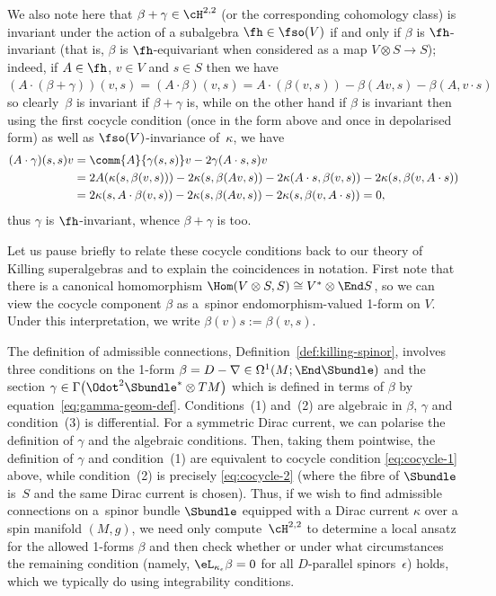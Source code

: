 We also note here that $\beta+\gamma\in\cH^{2,2}$ (or the corresponding cohomology class) is invariant under the action of a subalgebra $\fh\in\fso(V)$ if and only if $\beta$ is $\fh$-invariant (that is, $\beta$ is $\fh$-equivariant when considered as a map $V\otimes S\to S$); indeed, if $A\in\fh$, $v\in V$ and $s\in S$ then we have~${(A\cdot(\beta+\gamma))(v,s) = (A\cdot\beta)(v,s) = A\cdot (\beta(v,s)) - \beta(Av,s) - \beta(A,v\cdot s)}
$
so clearly~$\beta$ is invariant if $\beta+\gamma$ is, while on the other hand if $\beta$ is invariant then using the first cocycle condition (once in the form above and once in depolarised form) as well as $\fso(V)$-invariance of~$\kappa$, we have
\begin{align*}
(A\cdot\gamma)(s,s)v &= \comm{A}{\gamma(s,s)}v - 2\gamma(A\cdot s,s)v \\
	&= 2A(\kappa(s,\beta(v,s))) - 2\kappa(s,\beta(Av,s)) - 2\kappa(A\cdot s,\beta(v,s)) - 2\kappa(s,\beta(v,A\cdot s)) \\
	&= 2\kappa(s,A\cdot\beta(v,s)) - 2\kappa(s,\beta(Av,s)) - 2\kappa(s,\beta(v,A\cdot s))= 0,
\end{align*}
thus $\gamma$ is $\fh$-invariant, whence $\beta+\gamma$ is too.

\begin{Remark}
	Let us pause briefly to relate these cocycle conditions back to our theory of Killing superalgebras and to explain the coincidences in notation. First note that there is a canonical homomorphism $\Hom(V\otimes S,S)\cong V^*\otimes\End S$, so we can view the cocycle component $\beta$ as a~spinor endomorphism-valued 1-form on $V$. Under this interpretation, we write $\beta(v)s:=\beta(v,s)$.
	
	The definition of admissible connections, Definition~\ref{def:killing-spinor}, involves three conditions on the 1-form $\beta=D-\nabla\in\Omega^1(M;\End\Sbundle)$ and the section $\gamma\in\Gamma\bigl(\Odot^2\Sbundle^*\otimes TM\bigr)$ which is defined in terms of $\beta$ by equation~\eqref{eq:gamma-geom-def}. Conditions~(1) and~(2) are algebraic in $\beta$, $\gamma$ and condition~(3) is differential. For a symmetric Dirac current, we can polarise the definition of $\gamma$ and the algebraic conditions. Then, taking them pointwise, the definition of $\gamma$ and condition~(1) are equivalent to cocycle condition \eqref{eq:cocycle-1} above, while condition~(2) is precisely \eqref{eq:cocycle-2} (where the fibre of $\Sbundle$ is~$S$ and the same Dirac current is chosen). Thus, if we wish to find admissible connections on a~spinor bundle $\Sbundle$ equipped with a Dirac current $\kappa$ over a spin manifold $(M,g)$, we need only compute~$\cH^{2,2}$ to determine a local ansatz for the allowed 1-forms $\beta$ and then check whether or under what circumstances the remaining condition (namely, $\eL_{\kappa_\epsilon}\beta=0$ for all $D$-parallel spinors~$\epsilon$) holds, which we typically do using integrability conditions.
\end{Remark}

